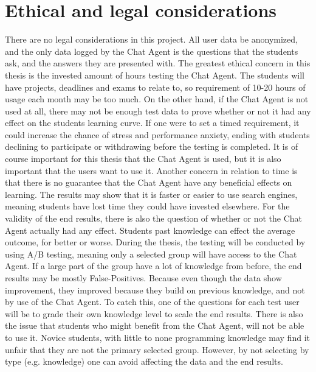 \chapter{Ethical and legal considerations}
\label{chapter8:ethical_legal_considerations}
There are no legal considerations in this project. All user data be anonymized, and the only data logged by the Chat Agent is the questions that the students ask, and the answers 
they are presented with. The greatest ethical concern in this thesis is the invested amount of hours testing the Chat Agent. The students will have projects, deadlines and exams 
to relate to, so requirement of 10-20 hours of usage each month may be too much. On the other hand, if the Chat Agent is not used at all, there may not be enough test data to prove 
whether or not it had any effect on the students learning curve. If one were to set a timed requirement, it could increase the chance of stress and performance anxiety, ending with 
students declining to participate or withdrawing before the testing is completed. It is of course important for this thesis that the Chat Agent is used, but it is also important that 
the users want to use it. Another concern in relation to time is that there is no guarantee that the Chat Agent have any beneficial effects on learning. The results may show that it 
is faster or easier to use search engines, meaning students have lost time they could have invested elsewhere.
\vspace{0.5em}\newline
For the validity of the end results, there is also the question of whether or not the Chat Agent actually had any effect. Students past knowledge can effect the average outcome, 
for better or worse. During the thesis, the testing will be conducted by using A/B testing, meaning only a selected group will have access to the Chat Agent. If a large part of the 
group have a lot of knowledge from before, the end results may be mostly False-Positives. Because even though the data show improvement, they improved because they build on previous 
knowledge, and not by use of the Chat Agent. To catch this, one of the questions for each test user will be to grade their own knowledge level to scale the end results. There is 
also the issue that students who might benefit from the Chat Agent, will not be able to use it. Novice students, with little to none programming knowledge may find it unfair that 
they are not the primary selected group. However, by not selecting by type (e.g. knowledge) one can avoid affecting the data and the end results.
